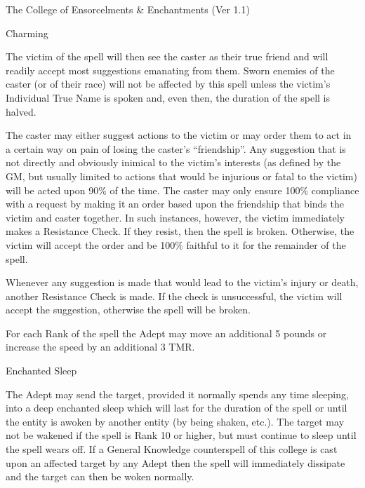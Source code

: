 \begin{Chapter}{The College of Ensorcelments \& Enchantments (Ver 1.1)}
\begin{spell}[G-1]{Charming}
\begin{effects}
The victim of the spell will then see the caster as their true friend
and will readily accept most suggestions emanating from them.  Sworn
enemies of the caster (or of their race) will not be affected by this
spell unless the victim’s Individual True Name is spoken and, even
then, the duration of the spell is halved.

The caster may either suggest actions to the victim or may order them
to act in a certain way on pain of losing the caster’s “friendship”.
Any suggestion that is not directly and obviously inimical to the
victim’s interests (as defined by the GM, but usually limited to
actions that would be injurious or fatal to the victim) will be acted
upon 90\% of the time.  The caster may only ensure 100\% compliance
with a request by making it an order based upon the friendship that
binds the victim and caster together.  In such instances, however, the
victim immediately makes a Resistance Check.  If they resist, then the
spell is broken.  Otherwise, the victim will accept the order and be
100\% faithful to it for the remainder of the spell.

Whenever any suggestion is made that would lead to the victim’s injury
or death, another Resistance Check is made.  If the check is
unsuccessful, the victim will accept the suggestion, otherwise the
spell will be broken.

For each Rank of the spell the Adept may move an additional 5 pounds
or increase the speed by an additional 3 TMR.
\end{effects}
\end{spell}

\begin{spell}[G-3]{Enchanted Sleep}

\begin{effects}
The Adept may send the target, provided it normally spends any time
sleeping, into a deep enchanted sleep which will last for the duration
of the spell or until the entity is awoken by another entity (by being
shaken, etc.).  The target may not be wakened if the spell is Rank 10
or higher, but must continue to sleep until the spell wears off. If a
General Knowledge counterspell of this college is cast upon an
affected target by any Adept then the spell will immediately dissipate
and the target can then be woken normally.
\end{effects}
\end{spell}


\end{Chapter}
